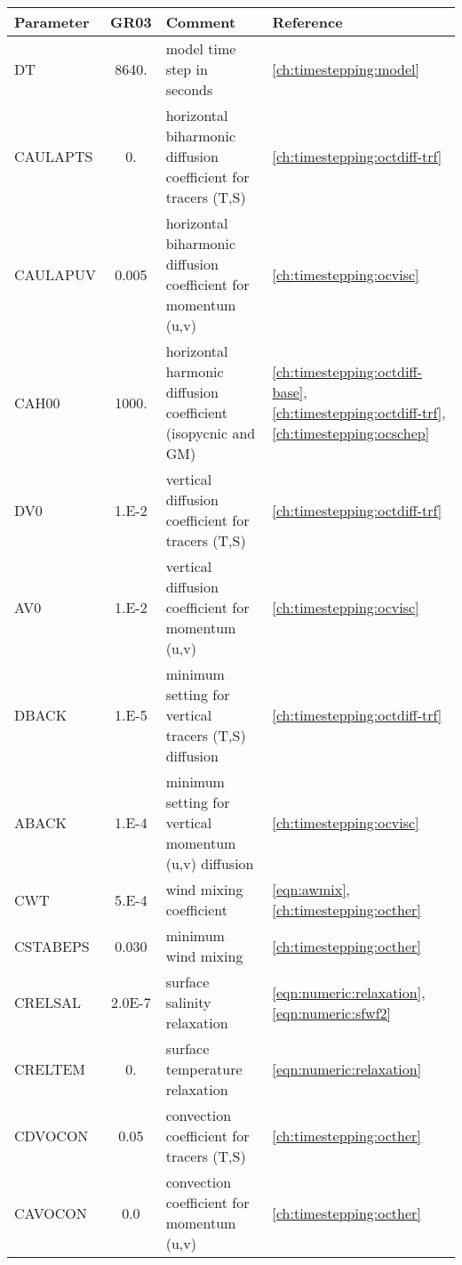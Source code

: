 \begin{table}
\begin{footnotesize}
\begin{tabular}{l|c|p{8cm}|p{2cm}}
Parameter & GR03 & Comment  & Reference\\ \hline\hline
DT	  &  8640.   &   model time step in seconds			                &  \ref{ch:timestepping:model} \\
CAULAPTS  &  0.      &   horizontal biharmonic diffusion coefficient for tracers (T,S)  &  \ref{ch:timestepping:octdiff-trf} \\
CAULAPUV  &  0.005   &   horizontal biharmonic diffusion coefficient for momentum (u,v) &  \ref{ch:timestepping:ocvisc} \\
CAH00	  &  1000.   &   horizontal harmonic diffusion coefficient (isopycnic and GM)   &  \ref{ch:timestepping:octdiff-base}, \ref{ch:timestepping:octdiff-trf}, \ref{ch:timestepping:ocschep}\\ \hline
DV0	  &  1.E-2   &	 vertical diffusion coefficient for tracers (T,S)	        &  \ref{ch:timestepping:octdiff-trf} \\
AV0	  &  1.E-2   &	 vertical diffusion coefficient for momentum (u,v)	        &  \ref{ch:timestepping:ocvisc} \\
DBACK	  &  1.E-5   &	 minimum setting for vertical tracers (T,S) diffusion	        &  \ref{ch:timestepping:octdiff-trf} \\
ABACK	  &  1.E-4   &	 minimum setting for vertical momentum (u,v) diffusion          &  \ref{ch:timestepping:ocvisc} \\ \hline
CWT	  &  5.E-4   &	 wind mixing coefficient 					&  \ref{eqn:awmix}, \ref{ch:timestepping:octher} \\
CSTABEPS  &  0.030   &   minimum wind mixing  					        &  \ref{ch:timestepping:octher} \\ \hline
CRELSAL   &  2.0E-7  &   surface salinity relaxation                                    &  \ref{eqn:numeric:relaxation}, \ref{eqn:numeric:sfwf2} \\
CRELTEM   &  0.      &   surface temperature relaxation      		                &  \ref{eqn:numeric:relaxation}  \\ \hline
CDVOCON   &  0.05    &	 convection coefficient for tracers (T,S)	                &  \ref{ch:timestepping:octher} \\
CAVOCON   &  0.0     &	 convection coefficient for momentum (u,v)	                &  \ref{ch:timestepping:octher} \\ \hline

\end{tabular}
\end{footnotesize}
\end{table}
